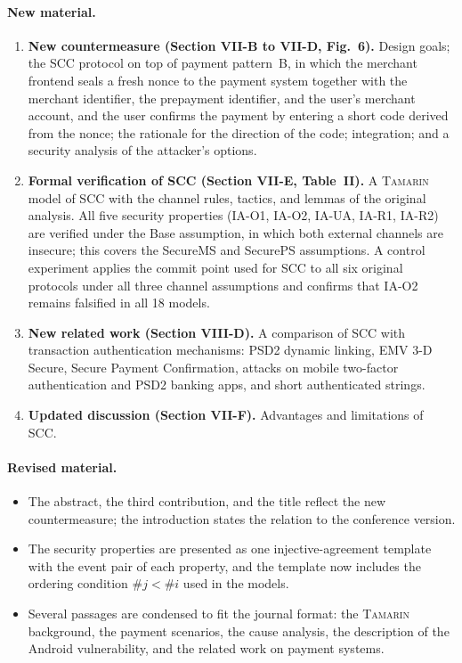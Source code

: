 \documentclass[11pt]{article}
\begin{document}
\paragraph{New material.}
\begin{enumerate}
  \item \textbf{New countermeasure (Section VII-B to VII-D, Fig.~6).}
  Design goals; the SCC protocol on top of payment pattern~B, in which the merchant frontend seals a fresh nonce to the payment system together with the merchant identifier, the prepayment identifier, and the user's merchant account, and the user confirms the payment by entering a short code derived from the nonce; the rationale for the direction of the code; integration; and a security analysis of the attacker's options.
  \item \textbf{Formal verification of SCC (Section VII-E, Table~II).}
  A \textsc{Tamarin} model of SCC with the channel rules, tactics, and lemmas of the original analysis.
  All five security properties (IA-O1, IA-O2, IA-UA, IA-R1, IA-R2) are verified under the Base assumption, in which both external channels are insecure; this covers the SecureMS and SecurePS assumptions.
  A control experiment applies the commit point used for SCC to all six original protocols under all three channel assumptions and confirms that IA-O2 remains falsified in all 18 models.
  \item \textbf{New related work (Section VIII-D).}
  A comparison of SCC with transaction authentication mechanisms: PSD2 dynamic linking, EMV 3-D Secure, Secure Payment Confirmation, attacks on mobile two-factor authentication and PSD2 banking apps, and short authenticated strings.
  \item \textbf{Updated discussion (Section VII-F).}
  Advantages and limitations of SCC.
\end{enumerate}

\paragraph{Revised material.}
\begin{itemize}
  \item The abstract, the third contribution, and the title reflect the new countermeasure; the introduction states the relation to the conference version.
  \item The security properties are presented as one injective-agreement template with the event pair of each property, and the template now includes the ordering condition $\#j < \#i$ used in the models.
  \item Several passages are condensed to fit the journal format: the \textsc{Tamarin} background, the payment scenarios, the cause analysis, the description of the Android vulnerability, and the related work on payment systems.
\end{itemize}
\end{document}
